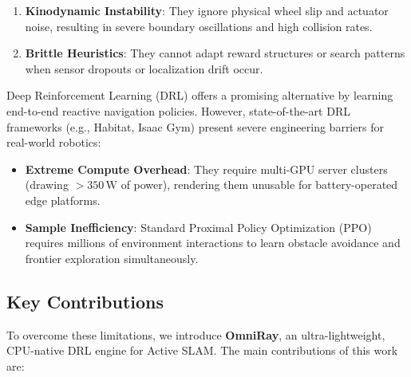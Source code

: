 \documentclass[11pt,a4paper]{article}
\begin{document}
\begin{enumerate}
    \item \textbf{Kinodynamic Instability}: They ignore physical wheel slip and actuator noise, resulting in severe boundary oscillations and high collision rates.
    \item \textbf{Brittle Heuristics}: They cannot adapt reward structures or search patterns when sensor dropouts or localization drift occur.
\end{enumerate}

Deep Reinforcement Learning (DRL) offers a promising alternative by learning end-to-end reactive navigation policies. However, state-of-the-art DRL frameworks (e.g., Habitat, Isaac Gym) present severe engineering barriers for real-world robotics:

\begin{itemize}
    \item \textbf{Extreme Compute Overhead}: They require multi-GPU server clusters (drawing $>350\,\text{W}$ of power), rendering them unusable for battery-operated edge platforms.
    \item \textbf{Sample Inefficiency}: Standard Proximal Policy Optimization (PPO) requires millions of environment interactions to learn obstacle avoidance and frontier exploration simultaneously.
\end{itemize}

\subsection{Key Contributions}

To overcome these limitations, we introduce \textbf{OmniRay}, an ultra-lightweight, CPU-native DRL engine for Active SLAM. The main contributions of this work are:
\end{document}
